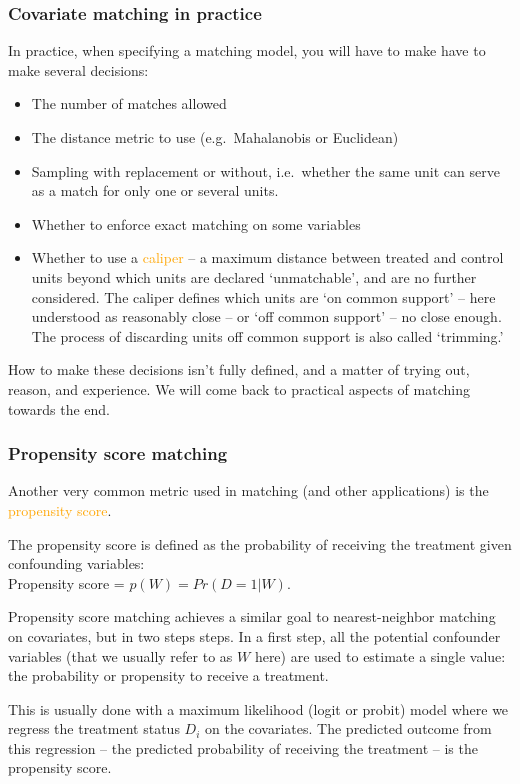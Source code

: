 \documentclass[12pt,english,dvipsnames,aspectratio=169,handout]{beamer}\usepackage[]{graphicx}\usepackage[]{xcolor}
\begin{document}
\begin{frame}
  \frametitle{Covariate matching in practice}
\footnotesize

In practice, when specifying a matching model, you will have to make have to make several decisions: 

\begin{itemize} \scriptsize
\item The number of matches allowed
\item The distance metric to use (e.g.\ Mahalanobis or Euclidean)
\item Sampling with replacement or without, i.e.\ whether the same unit can serve as a match for only one or several units.
\item Whether to enforce exact matching on some variables
\item Whether to use a \textcolor{orange}{caliper} -- a maximum distance between treated and control units beyond which units are declared `unmatchable', and are no further considered. The caliper defines which units are `on common support' -- here understood as reasonably close -- or `off common support' -- no close enough. The process of discarding units off common support is also called `trimming.'
\end{itemize}


How to make these decisions isn't fully defined, and a matter of trying out, reason, and experience. We will come back to practical aspects of matching towards the end.

\end{frame}


\begin{frame}
  \frametitle{Propensity score matching}
\footnotesize

Another very common metric used in matching (and other applications) is the \textcolor{orange}{propensity score}. 

The propensity score is defined as the probability of receiving the treatment given confounding variables:\\
Propensity score = $p(W) = Pr(D = 1|W)$.

Propensity score matching achieves a similar goal to nearest-neighbor matching on covariates, but in two steps steps. In a first step, all the potential confounder variables (that we usually refer to as $W$ here) are used to estimate a single value: the probability or propensity to receive a treatment.  

This is usually done with a maximum likelihood (logit or probit) model where we regress the treatment status $D_i$ on the covariates. The predicted outcome from this regression -- the predicted probability of receiving the treatment -- is the propensity score.

\end{frame}
\end{document}
